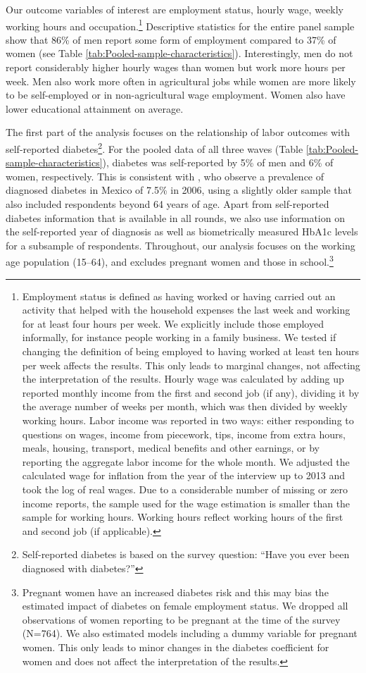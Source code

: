 \documentclass[12pt,english]{article}
\begin{document}
Our outcome variables of interest are employment status, hourly wage, weekly working hours and occupation.\footnote{Employment status is defined as having worked or having carried out an activity that helped with the household expenses the last week and working for at least four hours per week. We explicitly include those employed informally, for instance people working in a family business. We tested if changing the definition of being employed to having worked at least ten hours per week affects the results. This only leads to marginal changes, not affecting the interpretation of the results. Hourly wage was calculated by adding up reported monthly income from the first and second job (if any), dividing it by the average number of weeks per month, which was then divided by weekly working hours. Labor income was reported in two ways: either responding to questions on wages, income from piecework, tips, income from extra hours, meals, housing, transport, medical benefits and other earnings, or by reporting the aggregate labor income for the whole month. We adjusted the calculated wage for inflation from the year of the interview up to 2013 and took the log of real wages.  Due to a considerable number of missing or zero income reports, the sample used for the wage estimation is smaller than the sample for working hours. Working hours reflect working hours of the first and second job (if applicable).} Descriptive statistics for the entire panel sample show that 86\% of men report some form of employment compared to 37\% of women (see Table \ref{tab:Pooled-sample-characteristics}). Interestingly, men do not report considerably higher hourly wages than women but work more hours per week. Men also work more often in agricultural jobs while women are more likely to be self-employed or in non-agricultural wage employment. Women also have lower educational attainment on average.

The first part of the analysis focuses on the relationship of labor outcomes with self-reported diabetes\footnote{Self-reported diabetes is based on the survey question: “Have you ever been diagnosed with diabetes?”}. For the pooled data of all three waves (Table \ref{tab:Pooled-sample-characteristics}), diabetes was self-reported by 5\% of men and 6\% of women, respectively. This is consistent with \textcite{Barquera2013}, who observe a prevalence of diagnosed diabetes in Mexico of 7.5\% in 2006, using a slightly older sample that also included respondents beyond 64 years of age. Apart from self-reported diabetes information that is available in all rounds, we also use information on the self-reported year of diagnosis as well as biometrically measured \ac{HbA1c} levels for a subsample of respondents. Throughout, our analysis focuses on the working age population (15–64), and excludes pregnant women and those in school.\footnote{Pregnant women have an increased diabetes risk and this may bias the estimated impact of diabetes on female employment status. We dropped all observations of women reporting to be pregnant at the time of the survey (N=764). We also estimated models including a dummy variable for pregnant women. This only leads to minor changes in the diabetes coefficient for women and does not affect the interpretation of the results.}
\end{document}
